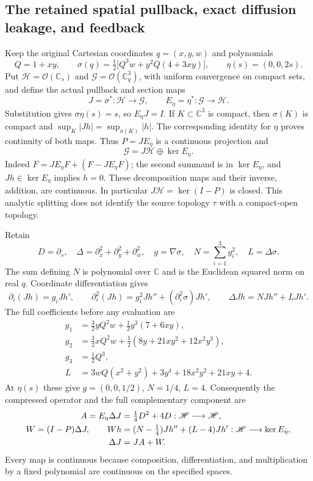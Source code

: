 \subsection{The retained spatial pullback, exact diffusion leakage, and feedback}
\label{sec:cq-spatial-diffusion-splitting}

Keep the original Cartesian coordinates $q=(x,y,w)$ and polynomials
\[
 Q=1+xy,\qquad
 \sigma(q)=\tfrac12\bigl[Q^3w+y^2Q(4+3xy)\bigr],\qquad
 \eta(s)=(0,0,2s).
\]
Put $\mathscr H=\mathcal O(\mathbb C_s)$ and
$\mathscr G=\mathcal O(\mathbb C_q^3)$, with uniform convergence on compact
sets, and define the actual pullback and section maps
\[
 J=\sigma^*:\mathscr H\longrightarrow\mathscr G,\qquad
 E_\eta=\eta^*:\mathscr G\longrightarrow\mathscr H.
\]
Substitution gives $\sigma\eta(s)=s$, so $E_\eta J=I$.
If $K\subset\mathbb C^3$ is compact, then $\sigma(K)$ is compact and
$\sup_K|Jh|=\sup_{\sigma(K)}|h|$. The corresponding identity for $\eta$
proves continuity of both maps. Thus $P=JE_\eta$ is a continuous
projection and
\begin{equation}
 \mathscr G=J\mathscr H\oplus\ker E_\eta .
 \label{eq:cq-spatial-splitting}
\end{equation}
Indeed $F=JE_\eta F+(F-JE_\eta F)$; the second summand is in
$\ker E_\eta$, and $Jh\in\ker E_\eta$ implies $h=0$.
These decomposition maps and their inverse, addition, are continuous.
In particular $J\mathscr H=\ker(I-P)$ is closed. This analytic splitting
does not identify the source topology $\tau$ with a compact-open topology.

Retain
\[
 D=\partial_s,\quad
 \Delta=\partial_x^2+\partial_y^2+\partial_w^2,\quad
 g=\nabla\sigma,\quad N=\sum_{i=1}^3g_i^2,\quad L=\Delta\sigma.
\]
The sum defining $N$ is polynomial over $\mathbb C$ and is the Euclidean
squared norm on real $q$. Coordinate differentiation gives
\[
 \partial_i(Jh)=g_iJh',\qquad
 \partial_i^2(Jh)=g_i^2Jh''+(\partial_i^2\sigma)Jh',
 \qquad \Delta Jh=NJh''+LJh'.
\]
The full coefficients before any evaluation are
\begin{align*}
 g_1&=\tfrac32yQ^2w+\tfrac12y^3(7+6xy),\\
 g_2&=\tfrac32xQ^2w+\tfrac12(8y+21xy^2+12x^2y^3),\\
 g_3&=\tfrac12Q^3,\\
 L&=3wQ(x^2+y^2)+3y^4+18x^2y^2+21xy+4 .
\end{align*}
At $\eta(s)$ these give $g=(0,0,1/2)$, $N=1/4$, $L=4$.
Consequently the compressed operator and the full complementary
component are
\begin{align}
 A=E_\eta\Delta J&=\tfrac14D^2+4D:
                  \mathscr H\longrightarrow\mathscr H,
                  \label{eq:cq-spatial-compression}\\
 W=(I-P)\Delta J,\qquad
 Wh&=(N-\tfrac14)Jh''+(L-4)Jh':
                  \mathscr H\longrightarrow\ker E_\eta ,
                  \label{eq:cq-spatial-leakage}\\
 \Delta J&=JA+W. \notag
\end{align}
Every map is continuous because composition, differentiation, and
multiplication by a fixed polynomial are continuous on the specified
spaces.

